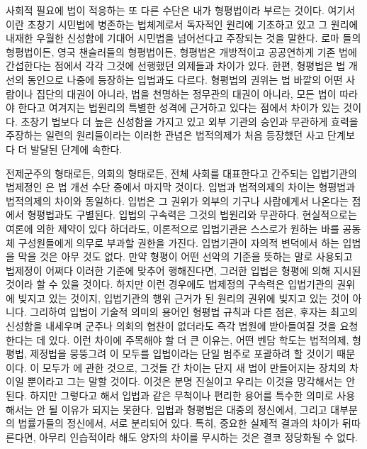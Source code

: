사회적 필요에 법이 적응하는 또 다른 수단은 내가 형평법이라 부르는 것이다.
여기서 이란 초창기 시민법에 병존하는 법체계로서
독자적인 원리에 기초하고 있고 그 원리에 내재한 우월한 신성함에 기대어
시민법을 넘어선다고 주장되는 것을 말한다.
로마 들의 형평법이든,
영국 챈슬러들의 형평법이든,
형평법은
개방적이고 공공연하게 기존 법에 간섭한다는 점에서
각각 그것에 선행했던 의제들과 차이가 있다.
한편, 형평법은 법 개선의 동인으로 나중에 등장하는 입법과도 다르다.
형평법의 권위는
법 바깥의 어떤 사람이나 집단의 대권이 아니라,
법을 천명하는 정무관의 대권이 아니라,
모든 법이 따라야 한다고 여겨지는 법원리의 특별한 성격에
근거하고 있다는 점에서 차이가 있는 것이다.
초창기 법보다 더 높은 신성함을 가지고 있고
외부 기관의 승인과 무관하게 효력을 주장하는
일련의 원리들이라는 이러한 관념은
법적의제가 처음 등장했던 사고 단계보다 더 발달된 단계에 속한다.

전제군주의 형태로든, 의회의 형태로든,
전체 사회를 대표한다고 간주되는 입법기관의 법제정인 은
법 개선 수단 중에서 마지막 것이다.
입법과 법적의제의 차이는 형평법과 법적의제의 차이와 동일하다.
입법은
그 권위가 외부의 기구나 사람에게서 나온다는 점에서
형평법과도 구별된다.
입법의 구속력은 그것의 법원리와 무관하다.
현실적으로는 여론에 의한 제약이 있다 하더라도,
이론적으로 입법기관은 스스로가 원하는 바를 공동체 구성원들에게
의무로 부과할 권한을 가진다.
입법기관이 자의적 변덕에서 하는 입법을 막을 것은 아무 것도 없다.
만약 형평이 어떤 선악의 기준을 뜻하는 말로 사용되고
법제정이 어쩌다 이러한 기준에 맞추어 행해진다면,
그러한 입법은 형평에 의해 지시된 것이라 할 수 있을 것이다.
하지만 이런 경우에도 법제정의 구속력은 입법기관의 권위에 빚지고 있는 것이지,
입법기관의 행위 근거가 된 원리의 권위에 빚지고 있는 것이 아니다.
그리하여 입법이 기술적 의미의 용어인 형평법 규칙과 다른 점은,
후자는 최고의 신성함을 내세우며 군주나 의회의 협찬이 없더라도
즉각 법원에 받아들여질 것을 요청한다는 데 있다.
이런 차이에 주목해야 할 더 큰 이유는,
어떤 벤담 학도는 법적의제, 형평법, 제정법을 뭉뚱그려
이 모두를 입법이라는 단일 범주로 포괄하려 할 것이기 때문이다.
이 모두가 에 관한 것으로,
그것들 간 차이는 단지 새 법이 만들어지는 장치의 차이일 뿐이라고 그는
말할 것이다.
이것은 분명 진실이고 우리는 이것을 망각해서는 안 된다.
하지만 그렇다고 해서 입법과 같은 무척이나 편리한 용어를
특수한 의미로 사용해서는 안 될 이유가 되지는 못한다.
입법과 형평법은 대중의 정신에서, 그리고 대부분의 법률가들의 정신에서,
서로 분리되어 있다.
특히, 중요한 실제적 결과의 차이가 뒤따른다면,
아무리 인습적이라 해도 양자의 차이를 무시하는 것은 결코 정당화될 수 없다.

